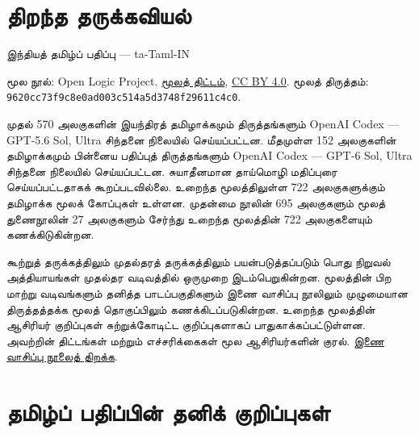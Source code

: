\documentclass[11pt,a4paper,openany]{memoir}
\begin{document}
\raggedright
\pagestyle{plain}
\chapter*{திறந்த தருக்கவியல்}
\noindent இந்தியத் தமிழ்ப் பதிப்பு — ta-Taml-IN

\noindent மூல நூல்: Open Logic Project.
\href{https://github.com/OpenLogicProject/OpenLogic}{மூலத் திட்டம்},
\href{https://creativecommons.org/licenses/by/4.0/}{CC BY 4.0}.
மூலத் திருத்தம்: \texttt{9620cc73f9c8e0ad003c514a5d3748f29611c4c0}.

\noindent முதல் 570 அலகுகளின் இயந்திரத் தமிழாக்கமும் திருத்தங்களும்
OpenAI Codex — GPT-5.6 Sol, Ultra சிந்தனை நிலையில் செய்யப்பட்டன.
மீதமுள்ள 152 அலகுகளின் தமிழாக்கமும் பின்னைய பதிப்புத் திருத்தங்களும்
OpenAI Codex — GPT-6 Sol, Ultra சிந்தனை நிலையில் செய்யப்பட்டன.
சுயாதீனமான தாய்மொழி மதிப்புரை செய்யப்பட்டதாகக் கூறப்படவில்லை.
உறைந்த மூலத்திலுள்ள 722 அலகுகளுக்கும் தமிழாக்க மூலக் கோப்புகள் உள்ளன.
முதன்மை நூலின் 695 அலகுகளும் மூலத் துணைநூலின் 27 அலகுகளும்
சேர்ந்து உறைந்த மூலத்தின் 722 அலகுகளையும் கணக்கிடுகின்றன.

\noindent கூற்றுத் தருக்கத்திலும் முதல்தரத் தருக்கத்திலும் பயன்படுத்தப்படும்
பொது நிறுவல் அத்தியாயங்கள் முதல்தர வடிவத்தில் ஒருமுறை இடம்பெறுகின்றன.
மூலத்தின் பிற மாற்று வடிவங்களும் தனித்த பாடப்பகுதிகளும்
இணை வாசிப்பு நூலிலும் முழுமையான திருத்தத்தக்க மூலத் தொகுப்பிலும்
கணக்கிடப்படுகின்றன. உறைந்த மூலத்தின் ஆசிரியர் குறிப்புகள்
சுற்றுக்கோடிட்ட குறிப்புகளாகப் பாதுகாக்கப்பட்டுள்ளன.
அவற்றின் திட்டங்கள் மற்றும் எச்சரிக்கைகள் மூல ஆசிரியர்களின் குரல்.
\href{tamil-source-companion.pdf}{இணை வாசிப்பு நூலைத் திறக்க}.

\clearpage
\begingroup
\sloppy
\renewcommand{\cftsectionfont}{\small}
\tableofcontents*
\endgroup






\chapter*{தமிழ்ப் பதிப்பின் தனிக் குறிப்புகள்}







\nocite{Frege1953,Peter1967}


\end{document}
